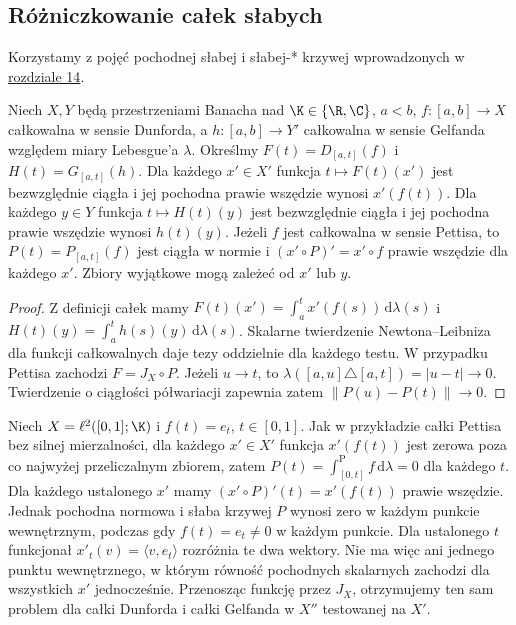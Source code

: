 \subsection{Różniczkowanie całek słabych}

Korzystamy z pojęć pochodnej słabej i słabej-* krzywej
wprowadzonych w \hyperref[def:weak-curve-derivative14]{rozdziale 14}.

\begin{twierdzenie}
\label{thm:weak-primitive-derivative15b}
Niech $X,Y$ będą przestrzeniami Banacha nad $\K\in\{\R,\C\}$,
$a<b$, $f:[a,b]\to X$ całkowalna w sensie Dunforda,
a $h:[a,b]\to Y'$ całkowalna w sensie Gelfanda
względem miary Lebesgue'a $\lambda$. Określmy
$F(t)=D_{[a,t]}(f)$ i $H(t)=G_{[a,t]}(h)$.
Dla każdego $x'\in X'$ funkcja $t\mapsto F(t)(x')$
jest bezwzględnie ciągła i jej pochodna prawie wszędzie
wynosi $x'(f(t))$. Dla każdego $y\in Y$ funkcja
$t\mapsto H(t)(y)$ jest bezwzględnie ciągła
i jej pochodna prawie wszędzie wynosi $h(t)(y)$.
Jeżeli $f$ jest całkowalna w sensie Pettisa, to
$P(t)=P_{[a,t]}(f)$ jest ciągła w normie i
$(x'\circ P)'=x'\circ f$ prawie wszędzie dla każdego $x'$.
Zbiory wyjątkowe mogą zależeć od $x'$ lub $y$.
\end{twierdzenie}
\begin{proof}
Z definicji całek mamy
$F(t)(x')=\int_a^t x'(f(s))\,\mathrm d\lambda(s)$
i $H(t)(y)=\int_a^t h(s)(y)\,\mathrm d\lambda(s)$.
Skalarne twierdzenie Newtona--Leibniza dla funkcji
całkowalnych daje tezy oddzielnie dla każdego testu.
W przypadku Pettisa zachodzi $F=J_X\circ P$.
Jeżeli $u\to t$, to
$\lambda([a,u]\triangle[a,t])=|u-t|\to0$.
Twierdzenie o ciągłości półwariacji zapewnia zatem
$\|P(u)-P(t)\|\to0$.
\end{proof}

\begin{przyklad}
\label{ex:weak-primitive-no-common-null15b}
Niech $X=\ell^2([0,1];\K)$ i $f(t)=e_t$, $t\in[0,1]$.
Jak w przykładzie całki Pettisa bez silnej mierzalności,
dla każdego $x'\in X'$ funkcja $x'(f(t))$ jest zerowa
poza co najwyżej przeliczalnym zbiorem, zatem
$P(t)=\int_{[0,t]}^{\mathrm P} f\,\mathrm d\lambda=0$
dla każdego $t$. Dla każdego ustalonego $x'$ mamy
$(x'\circ P)'(t)=x'(f(t))$ prawie wszędzie.
Jednak pochodna normowa i słaba krzywej $P$ wynosi zero
w każdym punkcie wewnętrznym, podczas gdy $f(t)=e_t\ne0$
w każdym punkcie. Dla ustalonego $t$ funkcjonał
$x'_t(v)=\langle v,e_t\rangle$ rozróżnia te dwa wektory.
Nie ma więc ani jednego punktu wewnętrznego, w którym
równość pochodnych skalarnych zachodzi dla wszystkich
$x'$ jednocześnie. Przenosząc funkcję przez $J_X$,
otrzymujemy ten sam problem dla całki Dunforda
i całki Gelfanda w $X''$ testowanej na $X'$.
\end{przyklad}

